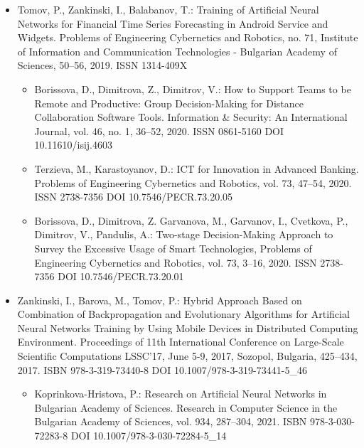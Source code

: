 \begin{itemize}
\item Tomov, P., Zankinski, I., Balabanov, T.: Training of Artificial Neural Networks for Financial Time Series Forecasting in Android Service and Widgets. Problems of Engineering Cybernetics and Robotics, no. 71, Institute of Information and Communication Technologies - Bulgarian Academy of Sciences, 50--56, 2019. ISSN 1314-409X
	\begin{itemize}
	\item Borissova, D., Dimitrova, Z., Dimitrov, V.: How to Support Teams to be Remote and Productive: Group Decision-Making for Distance Collaboration Software Tools. Information \& Security: An International Journal, vol. 46, no. 1, 36--52, 2020. ISSN 0861-5160 DOI 10.11610/isij.4603

	\item Terzieva, M., Karastoyanov, D.: ICT for Innovation in Advanced Banking. Problems of Engineering Cybernetics and Robotics, vol. 73, 47--54, 2020. ISSN 2738-7356 DOI 10.7546/PECR.73.20.05

	\item Borissova, D., Dimitrova, Z. Garvanova, M., Garvanov, I., Cvetkova, P., Dimitrov, V., Pandulis, A.: Two-stage Decision-Making Approach to Survey the Excessive Usage of Smart Technologies, Problems of Engineering Cybernetics and Robotics, vol. 73, 3--16, 2020. ISSN 2738-7356 DOI 10.7546/PECR.73.20.01
	\end{itemize}

\item Zankinski, I., Barova, M., Tomov, P.: Hybrid Approach Based on Combination of Backpropagation and Evolutionary Algorithms for Artificial Neural Networks Training by Using Mobile Devices in Distributed Computing Environment. Proceedings of 11th International Conference on Large-Scale Scientific Computations LSSC'17, June 5-9, 2017, Sozopol, Bulgaria, 425--434, 2017. ISBN 978-3-319-73440-8 DOI 10.1007/978-3-319-73441-5\_46
	\begin{itemize}
	\item Koprinkova-Hristova, P.: Research on Artificial Neural Networks in Bulgarian Academy of Sciences. Research in Computer Science in the Bulgarian Academy of Sciences, vol. 934, 287--304, 2021. ISBN 978-3-030-72283-8 DOI 10.1007/978-3-030-72284-5\_14
	\end{itemize}


\end{itemize}
